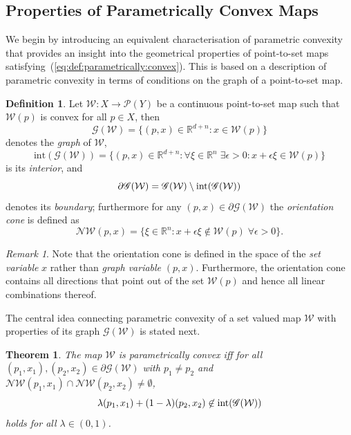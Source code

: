 \documentclass[journal]{IEEEtran}
\newcounter{thmcount}
\newtheorem{thm}[thmcount]{Theorem}
\theoremstyle{remark}
\newtheorem{rem}[thmcount]{Remark}
\theoremstyle{definition}
\newtheorem{defi}[thmcount]{Definition}
\begin{document}
\subsection{Properties of Parametrically Convex Maps}\label{ssec:properties:of:p:convex:maps}
%
We begin by introducing an equivalent characterisation of parametric convexity that provides an insight into the geometrical properties of 
point-to-set maps satisfying~(\ref{eq:def:parametrically:convex}).
This is based on a description of parametric convexity in terms of conditions on the graph of a point-to-set map.
%
\begin{defi}\label{def:graph:of:map}
Let $\mathcal W:X\rightarrow \mathscr P(Y)$ be a continuous point-to-set map
such that $\mathcal W(p)$ is convex for all $p\in X$, then 
%
\[
  \mathscr G(\mathcal W) = \{(p,x) \in\mathbb R^{d+n}: x\in\mathcal W(p)\}
\]
%
denotes the \emph{graph} of $\mathcal W$,
%
\[
  \text{int}(\mathscr G(\mathcal W)) = \{(p,x) \in\mathbb R^{d+n}: \forall \xi\in\mathbb R^n\;\exists 
  \epsilon>0 : x+\epsilon \xi\in \mathcal W(p)\}
\]
%
is its \emph{interior}, and
%
\[
  \partial \mathscr G(\mathcal W) = \mathscr G(\mathcal W)\setminus \textup{int}(\mathscr G(\mathcal W))
\]
%
denotes its \emph{boundary};
%
furthermore for any $(p,x)\in\partial\mathscr G(\mathcal W)$ the \emph{orientation cone} is defined as 
%
\[
  \mathcal N\mathcal W(p,x) = \{\xi\in\mathbb R^n: x+\epsilon \xi \not\in \mathcal W(p)\; \forall \epsilon>0\} .
\]

\end{defi}
%
\begin{rem}
%
Note that the orientation cone is defined in the space of the
\emph{set variable} $x$ rather than \emph{graph variable} $(p,x)$.
%
Furthermore, the orientation cone contains all directions that 
point out of the set $\mathcal W(p)$ and hence all linear combinations thereof.
%
\end{rem}
%
The central idea connecting parametric convexity of a set valued map $\mathcal W$ with properties of its graph $\mathscr G(\mathcal W)$ is stated next.
%
\begin{thm}\label{thm:p:convexity:graph}
The map $\mathcal W$ is parametrically convex iff for all $(p_1,x_1), (p_2,x_2)\in\partial\mathscr G(\mathcal W)$
with $p_1\neq p_2$ and $\mathcal N\mathcal W(p_1,x_1)\cap\mathcal N\mathcal W(p_2,x_2)\neq\emptyset$,
%
\begin{equation}\label{eq:graph:def:p:convexity}
\lambda (p_1,x_1) + (1-\lambda) (p_2,x_2) \not\in\textup{int} (\mathscr G(\mathcal W))
\end{equation}
%
holds for all $\lambda\in(0,1)$.
%
\end{thm}
\end{document}

